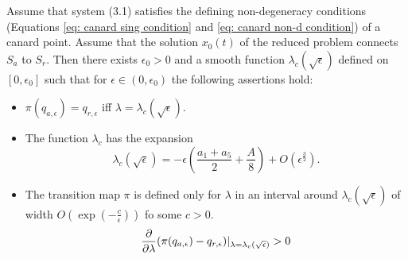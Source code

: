 \begin{theorem}
	Assume that system (3.1) satisfies the defining non-degeneracy conditions (Equations \ref{eq: canard sing condition} and \ref{eq: canard non-d condition}) of a canard point. Assume that the solution $ x_0(t) $ of the reduced problem connects $ S_a $ to $ S_r $. Then there exists $ \epsilon_0 > 0 $ and a smooth function $\lambda_c(\sqrt{\epsilon})$ defined on $ [0, \epsilon_0] $ such that for $\epsilon \in (0, \epsilon_0)$ the following assertions hold:
	\begin{itemize}
		\item $ \pi(q_{a,\epsilon})=q_{r,\epsilon} $ iff $ \lambda=\lambda_c(\sqrt{\epsilon}) $.\\
		\item The function $ \lambda_c $ has the expansion
		 \begin{equation*}
			\lambda_c(\sqrt{\epsilon})=-\epsilon(\frac{a_1+a_5}{2}+\frac{A}{8})+O(\epsilon^\frac{3}{2}).
			\end{equation*}
			\item The transition map $\pi$ is defined only for $\lambda$ in an interval around $ \lambda_c(\sqrt{\epsilon}) $ of width $ O(\exp(-\frac{c}{\epsilon})) $ fo some $ c>0 $.
			$$ \pd{}{\lambda}(\pi(q_{a,\epsilon})-q_{r,\epsilon})|_{\lambda=\lambda_c(\sqrt{\epsilon})}>0  $$
		
	\end{itemize}
\label{Theorem 3.1}
\end{theorem}
%



